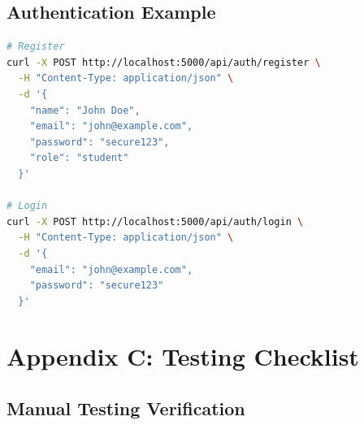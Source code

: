 \documentclass[12pt,a4paper]{report}
\begin{document}
\section{Authentication Example}

\begin{lstlisting}[language=bash]
# Register
curl -X POST http://localhost:5000/api/auth/register \
  -H "Content-Type: application/json" \
  -d '{
    "name": "John Doe",
    "email": "john@example.com",
    "password": "secure123",
    "role": "student"
  }'

# Login
curl -X POST http://localhost:5000/api/auth/login \
  -H "Content-Type: application/json" \
  -d '{
    "email": "john@example.com",
    "password": "secure123"
  }'
\end{lstlisting}

\chapter{Appendix C: Testing Checklist}

\section{Manual Testing Verification}
\end{document}
